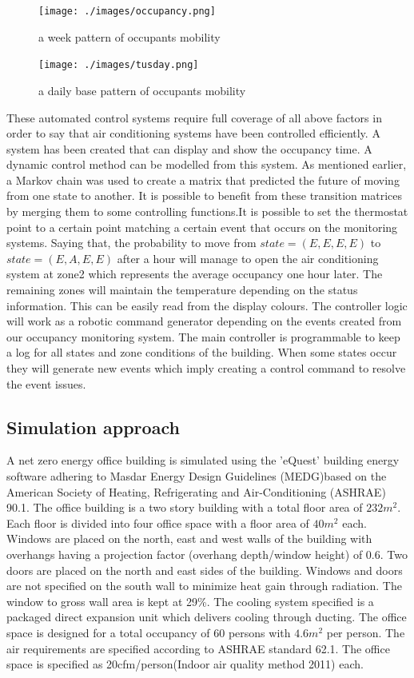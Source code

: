 \begin{figure}[!ht]
  \centering
 	  	\texttt{[image: ./images/occupancy.png]}
  \caption{a week pattern of occupants mobility}
\end{figure}

\begin{figure}[!ht]
  \centering
 	  	\texttt{[image: ./images/tusday.png]}
  \caption{a daily base pattern of occupants mobility}
\end{figure}

These automated control systems require full coverage of all above factors in order to say that air conditioning systems have been controlled efficiently. A system has been created that can display and show the occupancy time. A dynamic control method can be modelled from this system. As mentioned earlier, a Markov chain was used to create a matrix that predicted the future of moving from one state to another.  It is possible to benefit from these transition matrices by merging them to some controlling functions.It is possible to set the thermostat point to a certain point matching a certain event that occurs on the monitoring systems. Saying that, the probability to move from $state= (E,E,E,E)$ to $state=(E,A,E,E)$ after a hour will manage to open the air conditioning system at zone2 which represents the average occupancy one hour later. The remaining zones will maintain the temperature depending on the status information. This can be easily read from the display colours. The controller logic will work as a robotic command generator depending on the events created from our occupancy monitoring system. The main controller is programmable to keep a log for all states and zone conditions of the building. When some states occur they will generate new events which imply creating a control command to resolve the event issues.


\subsection{Simulation approach}
A net zero energy office building is simulated using the 'eQuest' building energy software adhering to Masdar Energy Design Guidelines (MEDG)based on the American Society of Heating, Refrigerating and Air-Conditioning (ASHRAE) 90.1. The office building is a two story building with a total floor area of $232m^2$. Each floor is divided into four office space with a floor area of $40m^2$ each. Windows are placed on the north, east and west walls of the building with overhangs having a projection factor (overhang depth/window height) of $0.6$. Two doors are placed on the north and east sides of the building. Windows and doors are not specified on the south wall to minimize heat gain through radiation. The window to gross wall area is kept at 29\%. The cooling system specified is a packaged direct expansion unit which delivers cooling through ducting.
The office space is designed for a total occupancy of 60 persons with $4.6 m^2$ per person. The air requirements are specified according to ASHRAE standard 62.1. The office space is specified as 20cfm/person(Indoor air quality method 2011) each.

